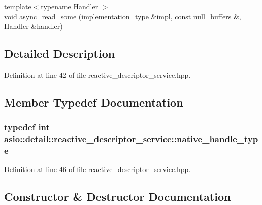 \begin{DoxyCompactItemize}
\item 
{\footnotesize template$<$typename Handler $>$ }\\void \hyperlink{classasio_1_1detail_1_1reactive__descriptor__service_ab366576376fd9be49ac542b74cc80242}{async\+\_\+read\+\_\+some} (\hyperlink{classasio_1_1detail_1_1reactive__descriptor__service_1_1implementation__type}{implementation\+\_\+type} \&impl, const \hyperlink{classasio_1_1null__buffers}{null\+\_\+buffers} \&, Handler \&handler)
\end{DoxyCompactItemize}


\subsection{Detailed Description}


Definition at line 42 of file reactive\+\_\+descriptor\+\_\+service.\+hpp.



\subsection{Member Typedef Documentation}
\hypertarget{classasio_1_1detail_1_1reactive__descriptor__service_af59f442d3eb8d39ffa9e7787b9fb0731}{}
\subsubsection[{native\+\_\+handle\+\_\+type}]{\setlength{\rightskip}{0pt plus 5cm}typedef int {\bf asio\+::detail\+::reactive\+\_\+descriptor\+\_\+service\+::native\+\_\+handle\+\_\+type}}\label{classasio_1_1detail_1_1reactive__descriptor__service_af59f442d3eb8d39ffa9e7787b9fb0731}


Definition at line 46 of file reactive\+\_\+descriptor\+\_\+service.\+hpp.



\subsection{Constructor \& Destructor Documentation}
\hypertarget{classasio_1_1detail_1_1reactive__descriptor__service_a96766ccbfd8ca4f01bd2d16771740dfa}{}
